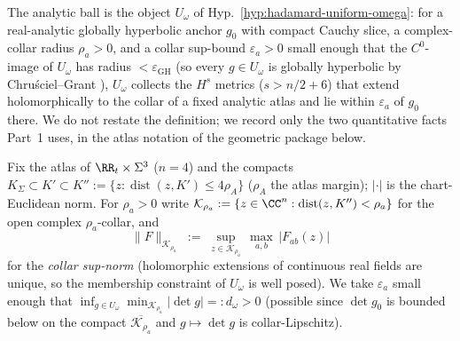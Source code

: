 The analytic ball is the object $U_\omega$ of Hyp.~\ref{hyp:hadamard-uniform-omega}:
for a real-analytic globally hyperbolic anchor $g_0$ with compact Cauchy slice,
a complex-collar radius $\rho_a>0$, and a collar sup-bound $\varepsilon_a>0$
small enough that the $C^0$-image of $U_\omega$ has radius $<\varepsilon_{\mathrm
{GH}}$ (so every $g\in U_\omega$ is globally hyperbolic by Chru\'sciel--Grant
\cite{ChruscielGrant2012}), $U_\omega$ collects the $H^s$ metrics
($s>n/2+6$) that extend holomorphically to the collar of a fixed analytic atlas
and lie within $\varepsilon_a$ of $g_0$ there. We do not restate the definition;
we record only the two quantitative facts Part~1 uses, in the atlas notation of
the geometric package below.

Fix the atlas of $\RR_t\times\Sigma^3$ ($n=4$) and the compacts $K_\Sigma\subset
K'\subset K'':=\{z:\operatorname{dist}(z,K')\le4\rho_A\}$ ($\rho_A$ the atlas
margin); $|\cdot|$ is the chart-Euclidean norm. For $\rho_a>0$ write $\mathcal
K_{\rho_a}:=\{z\in\CC^n:\operatorname{dist}(z,K'')<\rho_a\}$ for the open complex
$\rho_a$-collar, and
\begin{equation}\label{an17:eq-collarnorm}
 \|F\|_{\mathcal K_{\rho_a}}\;:=\;\sup_{z\in\mathcal K_{\rho_a}}\,\max_{a,b}\,
 |F_{ab}(z)|
\end{equation}
for the \emph{collar sup-norm} (holomorphic extensions of continuous real fields
are unique, so the membership constraint of $U_\omega$ is well posed). We take
$\varepsilon_a$ small enough that $\inf_{g\in U_\omega}\min_{\mathcal K_{\rho_a}}
|\det g|=:d_\omega>0$ (possible since $\det g_0$ is bounded below on the compact
$\overline{\mathcal K_{\rho_a}}$ and $g\mapsto\det g$ is collar-Lipschitz).

